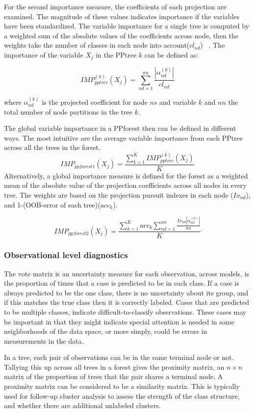\documentclass[12pt]{article}\usepackage[]{graphicx}\usepackage[]{color}
\begin{document}
For the second importance measure, the coefficients of each projection are examined. The magnitude of these values indicates importance if the variables have been standardized. The variable importance for a single tree is computed by a weighted sum of the absolute values of the coefficients across node, then the weights take the number of classes in each node into account($cl_{nd}$)~\citep{lee2013pptree} .
The importance of the variable $X_j$ in the PPtree $k$ can be defined as:

\[
IMP_{pptree}^{(k)}(X_j)=\sum_{nd = 1}^{nn}\frac{|\alpha_{nd}^{(k)}|}{cl_{nd} }
\]

\noindent where $\alpha_{nd}^{(k)}$ is the projected coefficient for node $ns$ and variable $k$ and $nn$ the total number of node partitions in the tree $k$.

The global variable importance in a PPforest then can be defined in different ways. The most intuitive are the average variable importance from each PPtree across all the trees in the forest.
\[
IMP_{ppforest1}(X_j)=\frac{\sum_{k=1}^K IMP_{pptree}^{(k)}(X_j)}{K}
\]
Alternatively, a global importance measure is defined for the forest as a weighted mean of the absolute value of the projection coefficients across all nodes in every tree. The weights are based on the projection pursuit indexes in each node ($Ix_{nd}$), and 1-(OOB-error of each tree)($acc_k$).

\[IMP_{ppforest2}(X_j)=\frac{\sum_{k=1}^K acc_k \sum_{nd = 1}^{nn}\frac{Ix_{nd}|\alpha_{nd}^{(k)}|}{nn }}{K}
\]

\subsubsection{Observational level diagnostics}

The vote matrix is an uncertainty measure for each observation, across models, is the proportion of times that a case is predicted to be in each class. If a case is always predicted to be the one class, there is no uncertainty about its group, and if this matches the true class then it is correctly labeled. Cases that are predicted to be multiple classes, indicate difficult-to-classify observations. These cases may be important in that they might indicate special attention is needed in some neighborhoods of the data space, or more simply, could be errors in measurements in the data.

In a tree, each pair of observations can be in the same terminal node or not. Tallying this up across all trees in a forest gives the proximity matrix, an $n\times n$ matrix of the proportion of trees that the pair shares a terminal node. A proximity matrix can be considered to be a similarity matrix. This is typically used for follow-up cluster analysis to assess the strength of the class structure, and whether there are additional unlabeled clusters.
\end{document}
